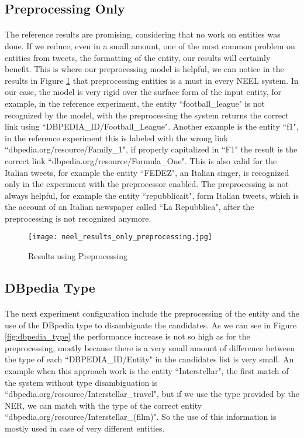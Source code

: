 \subsection{Preprocessing Only}
\paragraph{}
The reference results are promising, considering that no work on entities was done. If we reduce, even in a small amount, one of the most common problem on entities from tweets, the formatting of the entity, our results will certainly benefit. This is where our preprocessing model is helpful, we can notice in the results in Figure \ref{fig:preprocessing_only} that preprocessing entities is a must in every NEEL system. In our case, the model is very rigid over the surface form of the input entity, for example, in the reference experiment, the entity ``football\_league" is not recognized by the model, with the preprocessing the system returns the correct link using ``DBPEDIA\_ID/Football\_League". Another example is the entity ``f1", in the reference experiment this is labeled with the wrong link ``dbpedia.org/resource/Family\_1", if properly capitalized in ``F1" the result is the correct link ``dbpedia.org/resource/Formula\_One". This is also valid for the Italian tweets, for example the entity ``FEDEZ", an Italian singer, is recognized only in the experiment with the preprocessor enabled. The preprocessing is not always helpful, for example the entity ``repubblicait", form Italian tweets, which is the account of an Italian newspaper called ``La Repubblica", after the preprocessing is not recognized anymore.

\begin{figure}[ht]
\texttt{[image: neel\_results\_only\_preprocessing.jpg]}
\caption{Results using Preprocessing}
\label{fig:preprocessing_only}
\end{figure}
\vspace{-20pt}

\newpage

\subsection{DBpedia Type}
\paragraph{}
The next experiment configuration include the preprocessing of the entity and the use of the DBpedia type to disambiguate the candidates. As we can see in Figure \ref{fig:dbpedia_type} the performance increase is not so high as for the preprocessing, mostly because there is a very small amount of difference between the type of each ``DBPEDIA\_ID/Entity" in the candidates list is very small. An example when this approach work is the entity ``Interstellar", the first match of the system without type disambiguation is ``dbpedia.org/resource/Interstellar\_travel", but if we use the type provided by the NER, we can match with the type of the correct entity ``dbpedia.org/resource/Interstellar\_(film)". So the use of this information is mostly used in case of very different entities.


